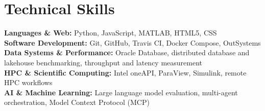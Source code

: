 \section*{Technical Skills}

\noindent
\textbf{Languages \& Web:} Python, JavaScript, MATLAB, HTML5, CSS\\
\textbf{Software Development:} Git, GitHub, Travis CI, Docker Compose,
OutSystems\\
\textbf{Data Systems \& Performance:} Oracle Database, distributed database
and lakehouse benchmarking, throughput and latency measurement\\
\textbf{HPC \& Scientific Computing:} Intel oneAPI, ParaView, Simulink,
remote HPC workflows\\
\textbf{AI \& Machine Learning:} Large language model evaluation,
multi-agent orchestration, Model Context Protocol (MCP)